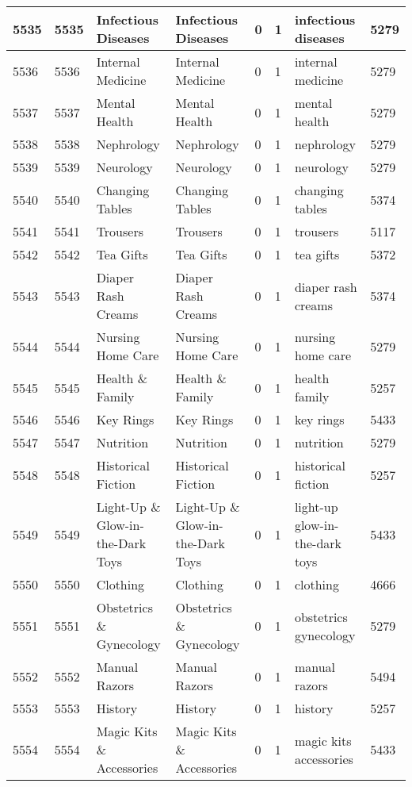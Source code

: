 \begin{longtable}{|l|l|l|l|l|l|l|l|}
5535 & 5535 & Infectious Diseases & Infectious Diseases & 0 & 1 & infectious diseases & 5279 \\ \hline 
5536 & 5536 & Internal Medicine & Internal Medicine & 0 & 1 & internal medicine & 5279 \\ \hline 
5537 & 5537 & Mental Health & Mental Health & 0 & 1 & mental health & 5279 \\ \hline 
5538 & 5538 & Nephrology & Nephrology & 0 & 1 & nephrology & 5279 \\ \hline 
5539 & 5539 & Neurology & Neurology & 0 & 1 & neurology & 5279 \\ \hline 
5540 & 5540 & Changing Tables & Changing Tables & 0 & 1 & changing tables & 5374 \\ \hline 
5541 & 5541 & Trousers & Trousers & 0 & 1 & trousers & 5117 \\ \hline 
5542 & 5542 & Tea Gifts & Tea Gifts & 0 & 1 & tea gifts & 5372 \\ \hline 
5543 & 5543 & Diaper Rash Creams & Diaper Rash Creams & 0 & 1 & diaper rash creams & 5374 \\ \hline 
5544 & 5544 & Nursing Home Care & Nursing Home Care & 0 & 1 & nursing home care & 5279 \\ \hline 
5545 & 5545 & Health \& Family & Health \& Family & 0 & 1 & health family & 5257 \\ \hline 
5546 & 5546 & Key Rings & Key Rings & 0 & 1 & key rings & 5433 \\ \hline 
5547 & 5547 & Nutrition & Nutrition & 0 & 1 & nutrition & 5279 \\ \hline 
5548 & 5548 & Historical Fiction & Historical Fiction & 0 & 1 & historical fiction & 5257 \\ \hline 
5549 & 5549 & Light-Up \& Glow-in-the-Dark Toys & Light-Up \& Glow-in-the-Dark Toys & 0 & 1 & light-up glow-in-the-dark toys & 5433 \\ \hline 
5550 & 5550 & Clothing & Clothing & 0 & 1 & clothing & 4666 \\ \hline 
5551 & 5551 & Obstetrics \& Gynecology & Obstetrics \& Gynecology & 0 & 1 & obstetrics gynecology & 5279 \\ \hline 
5552 & 5552 & Manual Razors & Manual Razors & 0 & 1 & manual razors & 5494 \\ \hline 
5553 & 5553 & History & History & 0 & 1 & history & 5257 \\ \hline 
5554 & 5554 & Magic Kits \& Accessories & Magic Kits \& Accessories & 0 & 1 & magic kits accessories & 5433 \\ \hline 

\end{longtable}
